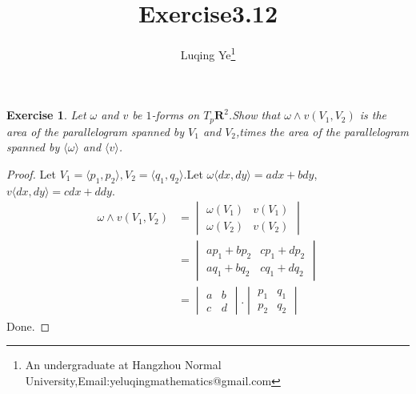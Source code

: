 \documentclass{article}
\newtheorem*{exe}{Exercise}
\newenvironment{exercise}
{\bigskip\begin{mdframed}\begin{exe}}
    {\end{exe}\end{mdframed}\bigskip}
\newcommand{\om}{\omega} \newcommand{\sik}{\sum_{i=1}^k}
\begin{document}
\title{Exercise3.12}\author{Luqing Ye\footnote{An undergraduate at Hangzhou Normal University,Email:yeluqingmathematics@gmail.com}}
\maketitle\noindent
\begin{exercise}
  Let $\omega$ and $v$ be $1$-forms on $T_p\mathbf{R}^2$.Show that
  $\om\wedge v(V_1,V_2)$ is the area of the parallelogram spanned by
  $V_1$ and $V_2$,times the area of the parallelogram spanned by
  $\langle \om\rangle$ and $\langle v\rangle$.
\end{exercise}
\begin{proof}
Let $V_1=\langle p_1,p_2\rangle,V_2=\langle q_1,q_2\rangle$.Let
$\om\langle dx,dy\rangle=adx +b dy$,$v\langle dx,dy\rangle=c dx+d dy$.
  \begin{align*}
    \om\wedge v(V_1,V_2)&=
    \begin{vmatrix}
      \om(V_1)&v(V_1)\\
\om(V_2)&v(V_2)
    \end{vmatrix}\\&=
    \begin{vmatrix}
      ap_1+bp_2&cp_1+dp_2\\
aq_1+bq_2&cq_1+dq_2
    \end{vmatrix}\\&=
    \begin{vmatrix}
      a&b\\
c&d
    \end{vmatrix}.
    \begin{vmatrix}
      p_1&q_{1}\\
p_{2}&q_2
    \end{vmatrix}
  \end{align*}
Done.
\end{proof}






% 
% 
\end{document}
